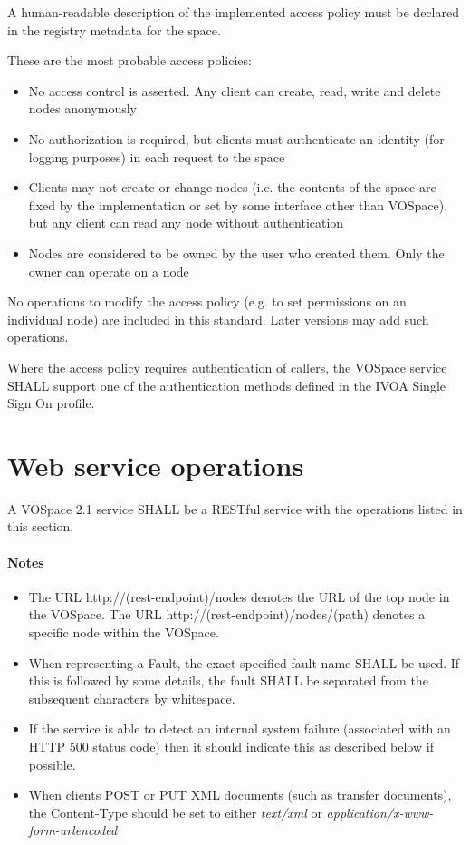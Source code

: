 \documentclass[11pt,a4paper]{ivoa}
\begin{document}
A human-readable description of the implemented access policy must be declared in the registry metadata for the space.

These are the most probable access policies:

\begin{itemize}
    \item No access control is asserted. Any client can create, read, write and delete nodes anonymously
    \item No authorization is required, but clients must authenticate an identity (for logging purposes) in each request to the space
    \item Clients may not create or change nodes (i.e. the contents of the space are fixed by the implementation or set by some interface other than VOSpace), but any client can read any node without authentication
    \item Nodes are considered to be owned by the user who created them. Only the owner can operate on a node
\end{itemize}

No operations to modify the access policy (e.g. to set permissions on an individual node) are included in this standard. Later versions may add such operations.

Where the access policy requires authentication of callers, the VOSpace service SHALL support one of the authentication methods defined in the IVOA Single Sign On profile.

\section{Web service operations}

A VOSpace 2.1 service SHALL be a RESTful service with the operations listed in this section.

\paragraph{Notes}
\begin{itemize}
    \item The URL http://(rest-endpoint)/nodes denotes the URL of the top node in the VOSpace. The URL http://(rest-endpoint)/nodes/(path) denotes a specific node within the VOSpace.
    \item When representing a Fault, the exact specified fault name SHALL be used. If this is followed by some details, the fault SHALL be separated from the subsequent characters by whitespace.
    \item If the service is able to detect an internal system failure (associated with an HTTP 500 status code) then it should indicate this as described below if possible.
    \item When clients POST or PUT XML documents (such as transfer documents), the Content-Type should be set to either \emph{text/xml} or \emph{application/x-www-form-urlencoded}
\end{itemize}
\end{document}
